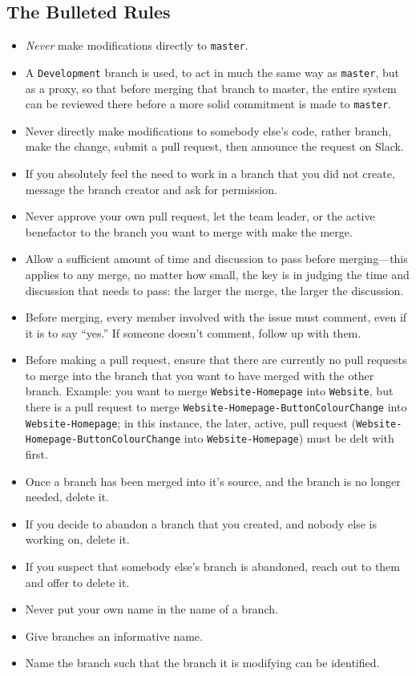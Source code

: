 \documentclass[12pt]{article}
\begin{document}
  \subsection{The Bulleted Rules}
  \begin{itemize}
   \item \textit{Never} make modifications directly to \texttt{master}.
   \item A \texttt{Development} branch is used, to act in much the same way as \texttt{master}, but as a proxy, so that before merging that branch to master, the entire system can be reviewed there before a more solid commitment is made to \texttt{master}.
   \item Never directly make modifications to somebody else's code, rather branch, make the change, submit a pull request, then announce the request on Slack.
   \item If you absolutely feel the need to work in a branch that you did not create, message the branch creator and ask for permission.
   \item Never approve your own pull request, let the team leader, or the active benefactor to the branch you want to merge with make the merge.
   \item Allow a sufficient amount of time and discussion to pass before merging---this applies to any merge, no matter how small, the key is in judging the time and discussion that needs to pass: the larger the merge, the larger the discussion.
   \item Before merging, every member involved with the issue must comment, even if it is to say ``yes.'' If someone doesn't comment, follow up with them.
   \item Before making a pull request, ensure that there are currently no pull requests to merge into the branch that you want to have merged with the other branch. Example: you want to merge \texttt{Website-Homepage} into \texttt{Website}, but there is a pull request to merge \texttt{Website-Homepage-ButtonColourChange} into \texttt{Website-Homepage}; in this instance, the later, active, pull request (\texttt{Website-Homepage-ButtonColourChange} into \texttt{Website-Homepage}) must be delt with first.
   \item Once a branch has been merged into it's source, and the branch is no longer needed, delete it.
   \item If you decide to abandon a branch that you created, and nobody else is working on, delete it.
   \item If you suspect that somebody else's branch is abandoned, reach out to them and offer to delete it.
   \item Never put your own name in the name of a branch.
   \item Give branches an informative name.
   \item Name the branch such that the branch it is modifying can be identified.
   
  \end{itemize}


  
\end{document}
